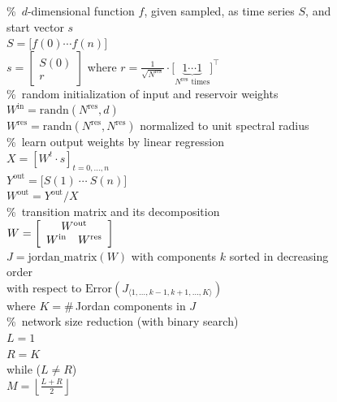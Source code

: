 \documentclass{sn-jnl}
\theoremstyle{definition}
\begin{document}
\begin{figure}
\newcommand{\commt}[1]{\%~#1\\}%
\begin{algorithmic}[1]\State
	\commt{$d$-dimensional function $f$, given sampled, as time series $S$, and start vector $s$}
	$S = \big[ f(0) \cdots f(n) \big]$\\
	$s = \left[ \begin{array}{c} S(0) \\ r \end{array} \right]$ where
		$r = \frac{1}{\sqrt{N^\mathrm{res}}} \cdot
		\big[ \underbrace{1 \cdots 1}_{N^\mathrm{res} \text{~times}} \big]^\top$\newline
	\\
	\commt{random initialization of input and reservoir weights}
	$W^\mathrm{in} = \mathrm{randn}(N^\mathrm{res},d)$\\
	$W^\mathrm{res} = \mathrm{randn}(N^\mathrm{res},N^\mathrm{res})$
		normalized to unit spectral radius\newline
	\\
	\commt{learn output weights by linear regression}
	$X = \left[W^t \cdot s\right]_{t=0,\dots,n}$ \\
	$Y^\mathrm{out} = \big[ S(1)\ \cdots\ S(n) \big]$\\
	$W^\mathrm{out} = Y^\mathrm{out}/X$\newline
	\\
	\commt{transition matrix and its decomposition}
	$W = \left[ \begin{array}{cc}
		\multicolumn{2}{c}{W^\mathrm{out}}\\
		W^\mathrm{in} & W^\mathrm{res}
	\end{array} \right]$\\
	$J = \mathrm{jordan\_matrix}(W)$ with components $k$ sorted in decreasing order\\
	\quad with respect to $\mathrm{Error}(J_{\langle 1,\dots,k-1,k+1,\dots,K \rangle})$\\
	\quad where $K = \#$\,Jordan components in $J$\newline
	\\
	\commt{network size reduction (with binary search)}
	$L = 1$ \\
	$R = K$ \\
	while ($L \neq R$)\\
	\quad $M = \left\lfloor\frac{L+R}{2}\right\rfloor$\\

\end{algorithmic}
\end{figure}
\end{document}

